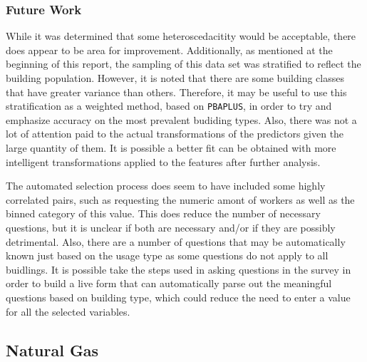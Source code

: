 \subsubsection{Future Work}
While it was determined that some heteroscedacitity would be acceptable, there does appear to be area for improvement.  Additionally, as mentioned at the beginning of this report, the sampling of this data set was stratified to reflect the building population.  However, it is noted that there are some building classes that have greater variance than others.  Therefore, it may be useful to use this stratification as a weighted method, based on \lstinline{PBAPLUS}, in order to try and emphasize accuracy on the most prevalent budiding types. Also, there was not a lot of attention paid to the actual transformations of the predictors given the large quantity of them.  It is possible a better fit can be obtained with more intelligent transformations applied to the features after further analysis.

The automated selection process does seem to have included some highly correlated pairs, such as requesting the numeric amont of workers as well as the binned category of this value.  This does reduce the number of necessary questions, but it is unclear if both are necessary and/or if they are possibly detrimental.  Also, there are a number of questions that may be automatically known just based on the usage type as some questions do not apply to all buidlings.  It is possible take the steps used in asking questions in the survey in order to build a live form that can automatically parse out the meaningful questions based on building type, which could reduce the need to enter a value for all the selected variables.

\FloatBarrier
\newpage
\subsection{Natural Gas}




